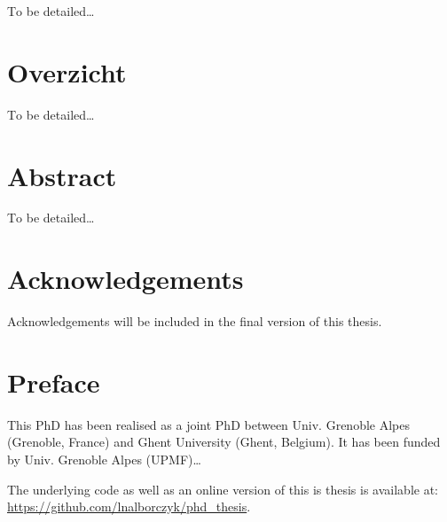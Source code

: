 \documentclass[a4paper,12pt,twoside,openright,oldfontcommands]{memoir}
\newcommand{\initial}[1]{
	\lettrine[lines=3,lhang=0.33,nindent=0em]{
		\color{gray}
     		{\textsc{#1}}}{}}
\newcommand\blankpage{%
    \null
    \thispagestyle{empty}%
    \newpage
    }
\begin{document}
\initial{T}o be detailed\ldots{}

\afterpage{\blankpage}

\chapter*{Overzicht}

\initial{T}o be detailed\ldots{}

\afterpage{\blankpage}

\chapter*{Abstract}

\initial{T}o be detailed\ldots{}

\afterpage{\blankpage}

\chapter*{Acknowledgements}

\initial{A}cknowledgements will be included in the final version of this
thesis.

\afterpage{\blankpage}

\chapter*{Preface}

\initial{T}his PhD has been realised as a joint PhD between Univ.
Grenoble Alpes (Grenoble, France) and Ghent University (Ghent, Belgium).
It has been funded by Univ. Grenoble Alpes (UPMF)\ldots{}

The underlying code as well as an online version of this is thesis is
available at: \url{https://github.com/lnalborczyk/phd_thesis}.

\newpage

\blankpage

\renewcommand{\contentsname}{Table of contents}

 \tableofcontents*
{}
\newpage

\listoftables
{}
\newpage

\listoffigures
{}
\newpage
\end{document}
